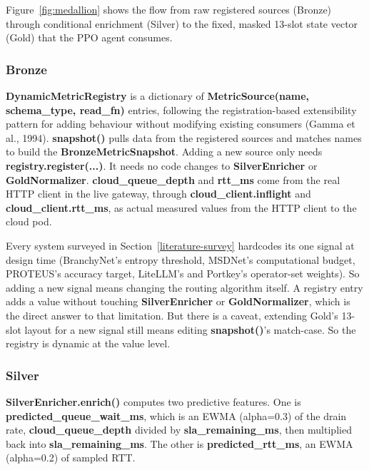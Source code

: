 Figure~\ref{fig:medallion} shows the flow from raw registered sources
(Bronze) through conditional enrichment (Silver) to the fixed, masked
13-slot state vector (Gold) that the PPO agent consumes.

\hypertarget{bronze}{%
\subsubsection{Bronze}\label{bronze}}

\textbf{DynamicMetricRegistry} is a dictionary of
\textbf{MetricSource(name, schema\_type, read\_fn)} entries, following
the registration-based extensibility pattern for adding behaviour
without modifying existing consumers (Gamma et al., 1994).
\textbf{snapshot()} pulls data from the registered sources and matches
names to build the \textbf{BronzeMetricSnapshot}. Adding a new source
only needs \textbf{registry.register(...)}. It needs no code changes to
\textbf{SilverEnricher} or \textbf{GoldNormalizer}.
\textbf{cloud\_queue\_depth} and \textbf{rtt\_ms} come from the real
HTTP client in the live gateway, through \textbf{cloud\_client.inflight}
and \textbf{cloud\_client.rtt\_ms}, as actual measured values from the
HTTP client to the cloud pod.

Every system surveyed in Section~\ref{literature-survey} hardcodes its one signal at design
time (BranchyNet's entropy threshold, MSDNet's computational budget,
PROTEUS's accuracy target, LiteLLM's and Portkey's operator-set
weights). So adding a new signal means changing the routing
algorithm itself. A registry entry adds a value without touching
\textbf{SilverEnricher} or \textbf{GoldNormalizer}, which is the direct
answer to that limitation. But there is a caveat, extending Gold's 13-slot
layout for a new signal still means editing \textbf{snapshot()}'s match-case.
So the registry is dynamic at the value level.

\hypertarget{silver}{%
\subsubsection{Silver}\label{silver}}

\textbf{SilverEnricher.enrich()} computes two predictive features. One is
\textbf{predicted\_queue\_wait\_ms}, which is an EWMA (alpha=0.3) of the
drain rate, \textbf{cloud\_queue\_depth} divided by
\textbf{sla\_remaining\_ms}, then multiplied back into
\textbf{sla\_remaining\_ms}. The other is \textbf{predicted\_rtt\_ms}, an
EWMA (alpha=0.2) of sampled RTT.

